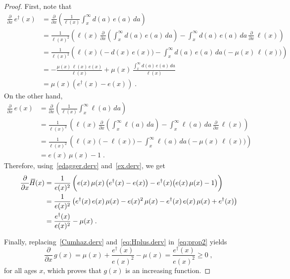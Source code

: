 \documentclass[a4paper,twoside, openright, 12pt, leqno]{article}
\newcommand*\xbar[1]{%
   \hbox{%
     \vbox{%
       \hrule height 0.5pt %
       \kern0.3ex%
       \hbox{%
         \kern-0.25em%
         \ensuremath{#1}%
         \kern-0.05em%
       }%
     }%
   }%
}
\begin{document}
\begin{proof}
First, note that
%
\begin{equation}
 \begin{split}
  \frac{\partial}{\partial x}\,e^\dagger(x)	    
            & = \frac{\partial}{\partial x}\left(\frac{1}{\ell(x)}\int_x^\infty d(a)\,e(a)\,da\right)   \\
            & = \frac{1}{\ell(x)^2}\left(\ell(x)\,\frac{\partial}{\partial x}\left(\int_x^\infty d(a)\,e(a)\,da\right)-\int_x^\infty d(a)\,e(a)\,da\,\frac{\partial}{\partial x}\,\ell(x)\right)                                    \\
            & = \frac{1}{\ell(x)^2}\left(\ell(x)\,\big(-d(x)\,e(x)\big)-\int_x^\infty d(a)\,e(a)\,da\,\big(-\mu(x)\,\ell(x)\big)\right)                         \\
            & = -\frac{\mu(x)\,\ell(x)\,e(x)}{\ell(x)}+\mu(x)\,\frac{\int_x^\infty d(a)\,e(a)\,da}{\ell(x)}                                    \\
            & = \mu(x)\left(e^\dagger(x)-e(x)\right)\;.
 \end{split}
 \label{edagger.derv}
\end{equation}
%
On the other hand,
%
\begin{equation}
  \begin{split}
  \frac{\partial}{\partial x}\,e(x) 
        & = \frac{\partial }{\partial x}\left(\frac{1}{\ell(x)}\int_x^\infty\ell(a)\,da\right)    \\
        & = \frac{1}{\ell(x)^2}\,\left(\ell(x)\,\frac{\partial }{\partial x}\left(\int_x^\infty\ell(a)\,da\right)-\int_x^\infty\ell(a)\,da\,\frac{\partial }{\partial x}\,\ell(x)\right) \\
        & = \frac{1}{\ell(x)^2}\,\left(\ell(x)\,\big(-\ell(x)\big)-\int_x^\infty\ell(a)\,da\,\big(-\mu(x)\,\ell(x)\big)\right)                                  \\
        & = e(x)\,\mu(x)-1\;.
  \end{split}
  \label{ex.derv}
\end{equation}
%
Therefore, using~\eqref{edagger.derv} and~\eqref{ex.derv}, we get
%
\begin{equation}
  \begin{split}
    \frac{\partial}{\partial x}\,\xbar{H}(x)
      & = \frac{1}{e(x)^2}\,\bigg(e(x)\,\mu(x)\left(e^\dagger(x)-e(x)\right)-e^\dagger(x)\big(e(x)\,\mu(x)-1\big)\bigg)                \\
      & = \frac{1}{e(x)^2}\left(e^\dagger(x)\,e(x)\,\mu(x)-e(x)^2\,\mu(x)-e^\dagger(x)\,e(x)\,\mu(x)+e^\dagger(x)\right)                              \\
      & = \frac{e^\dagger(x)}{e(x)^2}-\mu(x)\;.      
  \end{split}
  \label{eq:Hplus.derv}
\end{equation}

Finally, replacing~\eqref{Cumhaz.derv} and~\eqref{eq:Hplus.derv} in~\eqref{eq:prop2} yields
%
\begin{equation*}
 \frac{\partial}{\partial x}\,g(x)=\mu(x)+\frac{e^\dagger(x)}{e(x)^2}-\mu(x)=\frac{e^\dagger(x)}{e(x)^2}\geq0\;,
\end{equation*}
%
for all ages $x$, which proves that $g(x)$ is an increasing function.
\end{proof}
\end{document}
